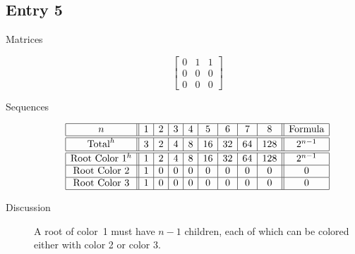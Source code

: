 \documentclass[12pt]{amsart}
\begin{document}
\subsection*{Entry 5}
\begin{description}
    \item[Matrices]
    
    \[\begin{bmatrix}
0 & 1 & 1 \\
0 & 0 & 0 \\
0 & 0 & 0
\end{bmatrix}\]
    \item[Sequences]\hspace*{\fill}\vspace{-0.5cm}
    \begin{center}
        \[
        \begin{array}{|c||c|c|c|c|c|c|c|c||c|}\hline
           n  & 1 & 2 & 3 & 4 & 5 & 6 & 7 & 8  & \text{Formula}\\\hline\hline
           \text{Total}^h  & 3 & 2 & 4 & 8 & 16 & 32 & 64 & 128 & 2^{n-1}\\\hline\hline
           \text{Root Color }1^h & 1 & 2 & 4 & 8 & 16 & 32 & 64 & 128 & 2^{n-1}\\\hline
           \text{Root Color }2 & 1 & 0 & 0 & 0 & 0 & 0 & 0 & 0 & 0\\\hline
           \text{Root Color }3 & 1 & 0 & 0 & 0 & 0 & 0 & 0 & 0 & 0\\\hline
        \end{array}
        \]
    \end{center}
    

    \item[Discussion] A root of color~1 must have $n-1$ children, each of which can be colored either with color 2 or color 3.
\end{description}
\end{document}
